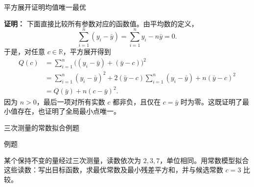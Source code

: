 \documentclass[aspectratio=169,10pt,fontset=fandol]{ctexbeamer}
\begin{document}
\begin{frame}[t,fragile]{平方展开证明均值唯一最优}
\footnotesize
{\footnotesize
\textbf{证明：}
下面直接比较所有参数对应的函数值。由平均数的定义，
\[
\sum_{i=1}^{n}(y_i-\bar{y})=\sum_{i=1}^{n}y_i-n\bar{y}=0.
\]
于是，对任意 $c\in\mathbb{R}$，平方展开得到
\[
\begin{aligned}
Q(c)&=\sum_{i=1}^{n}\bigl((y_i-\bar{y})+(\bar{y}-c)\bigr)^2\\
&=\sum_{i=1}^{n}(y_i-\bar{y})^2
 +2(\bar{y}-c)\sum_{i=1}^{n}(y_i-\bar{y})
 +n(\bar{y}-c)^2\\
&=Q(\bar{y})+n(c-\bar{y})^2.
\end{aligned}
\]
因为 $n>0$，最后一项对所有实数 $c$ 都非负，且仅在 $c=\bar{y}$ 时为零。这既证明了最小值存在，也证明了全局最小点唯一。

}
\end{frame}
\begin{frame}[t,fragile]{三次测量的常数拟合例题}
\normalsize
\begin{block}{例题}
{\normalsize
某个保持不变的量经过三次测量，读数依次为 $2,3,7$，单位相同。用常数模型拟合这些读数：写出目标函数，求最优常数及最小残差平方和，并与候选常数 $c=3$ 比较。

}
\end{block}
\end{frame}
\end{document}
